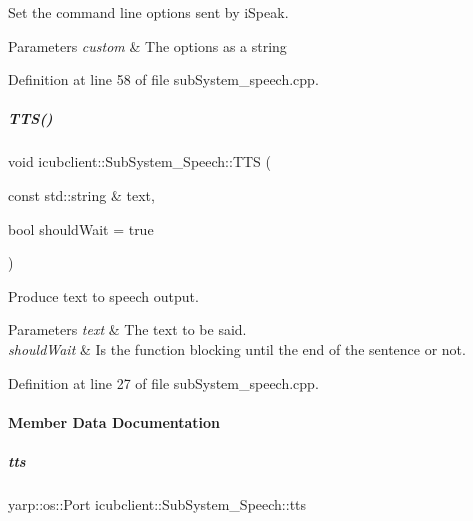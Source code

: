 Set the command line options sent by i\+Speak. 


\begin{DoxyParams}{Parameters}
{\em custom} & The options as a string \\
\hline
\end{DoxyParams}


Definition at line 58 of file sub\+System\+\_\+speech.\+cpp.

\mbox{\label{group__icubclient__subsystems_aec30b053cc477248ac8c50e8b8d16c38}} 
\subparagraph{\texorpdfstring{T\+T\+S()}{TTS()}}
{\footnotesize\ttfamily void icubclient\+::\+Sub\+System\+\_\+\+Speech\+::\+T\+TS (\begin{DoxyParamCaption}\item[{const std\+::string \&}]{text,  }\item[{bool}]{should\+Wait = {\ttfamily true} }\end{DoxyParamCaption})\hspace{0.3cm}{\ttfamily [virtual]}}



Produce text to speech output. 


\begin{DoxyParams}{Parameters}
{\em text} & The text to be said. \\
\hline
{\em should\+Wait} & Is the function blocking until the end of the sentence or not. \\
\hline
\end{DoxyParams}


Definition at line 27 of file sub\+System\+\_\+speech.\+cpp.



\paragraph{Member Data Documentation}
\mbox{\label{group__icubclient__subsystems_a773a18382b36c671d74ab5caaeb873bc}} 
\subparagraph{\texorpdfstring{tts}{tts}}
{\footnotesize\ttfamily yarp\+::os\+::\+Port icubclient\+::\+Sub\+System\+\_\+\+Speech\+::tts\hspace{0.3cm}{\ttfamily [protected]}}



